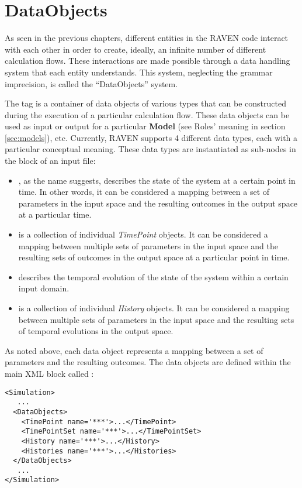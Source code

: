 \section{DataObjects}
\label{sec:DataObjects}

As seen in the previous chapters, different entities in the RAVEN
code interact with each other in order to create, ideally, an infinite number of
different calculation flows.
%
These interactions are made possible through a data handling system that each
entity understands.
%
This system, neglecting the grammar imprecision, is called the ``DataObjects''
system.

The  tag is a container of data objects of various types that can
be constructed during the execution of a particular calculation flow.
%
These data objects can be used as input or output for a particular
\textbf{Model} (see Roles' meaning in section \ref{sec:models}), etc.
%
Currently, RAVEN supports 4 different data types, each with a particular
conceptual meaning.
%
These data types are instantiated as sub-nodes in the  block of
an input file:
\begin{itemize}
  \item {}, as the name suggests, describes the state of the
  system at a certain point in time.
  In other words, it can be considered a mapping between a set of parameters
  in the input space and the resulting outcomes in the output space at a
  particular time.
  \item {} is a collection of individual \textit{TimePoint}
  objects.
  It can be considered a mapping between multiple sets of parameters in the
  input space and the resulting sets of outcomes in the output space at a
  particular point in time.
  \item {} describes the temporal evolution of the state of the
  system within a certain input domain.
  \item {} is a collection of individual \textit{History}
  objects.
  It can be considered a mapping between multiple sets of parameters in the
  input space and the resulting sets of temporal evolutions in the output
  space.
\end{itemize}

As noted above, each data object represents a mapping between a set of
parameters and the resulting outcomes.
%
The data objects are defined within the main XML block called :
\begin{lstlisting}[style=XML]
<Simulation>
   ...
  <DataObjects>
    <TimePoint name='***'>...</TimePoint>
    <TimePointSet name='***'>...</TimePointSet>
    <History name='***'>...</History>
    <Histories name='***'>...</Histories>
  </DataObjects>
   ...
</Simulation>
\end{lstlisting}

